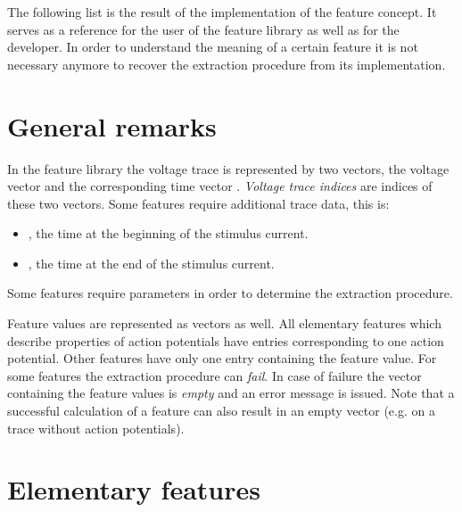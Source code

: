 \label{app:features}
The following list is the result of the implementation of the feature concept.
It serves as a reference for the user of the feature library as well as for the developer.
In order to understand the meaning of a certain feature it is not necessary anymore to recover the extraction procedure from its implementation.

\section{General remarks}

In the feature library the voltage trace is represented by two vectors, the voltage vector  and the corresponding time vector .
\emph{Voltage trace indices} are indices of these two vectors.
Some features require additional trace data, this is:

\begin{itemize}
  \item {}, the time at the beginning of the stimulus current.
  \item {}, the time at the end of the stimulus current.
\end{itemize}

Some features require parameters in order to determine the extraction procedure.

Feature values are represented as vectors as well.
All elementary features which describe properties of action potentials have entries corresponding to one action potential.
Other features have only one entry containing the feature value.
For some features the extraction procedure can \emph{fail}.
In case of failure the vector containing the feature values is \emph{empty} and an error message is issued.
Note that a successful calculation of a feature can also result in an empty vector (e.g.  on a trace without action potentials).

\section{Elementary features}

